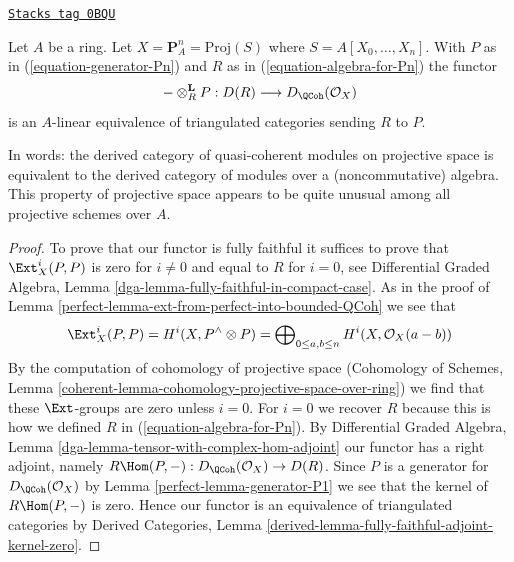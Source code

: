 \begin{lemma}
\label{perfect-lemma-Pn-module-category}
\href{https://stacks.math.columbia.edu/tag/0BQU}{\texttt{Stacks tag 0BQU}}

\begin{reference}
\cite{Beilinson}
\end{reference}
Let $A$ be a ring. Let $X = \mathbf{P}^n_A = \text{Proj}(S)$
where $S = A[X_0, \ldots, X_n]$. With
$P$ as in (\ref{equation-generator-Pn}) and
$R$ as in (\ref{equation-algebra-for-Pn})
the functor
$$
- \otimes_R^\mathbf{L} P : D(R) \longrightarrow D_\QCoh(\mathcal{O}_X)
$$
is an $A$-linear equivalence of triangulated categories sending $R$
to $P$.
\end{lemma}

In words: the derived category of quasi-coherent modules on
projective space is equivalent to the derived category of modules
over a (noncommutative) algebra.
This property of projective space appears to be quite unusual among
all projective schemes over $A$.

\begin{proof}

To prove that our functor is fully faithful it suffices to prove
that $\Ext^i_X(P, P)$ is zero for $i \not = 0$ and equal
to $R$ for $i = 0$, see
Differential Graded Algebra, Lemma
\ref{dga-lemma-fully-faithful-in-compact-case}.
As in the proof of
Lemma \ref{perfect-lemma-ext-from-perfect-into-bounded-QCoh}
we see that
$$
\Ext^i_X(P, P) = H^i(X, P^\wedge \otimes P) =
\bigoplus\nolimits_{0 \leq a, b \leq n} H^i(X, \mathcal{O}_X(a - b))
$$
By the computation of cohomology of projective space
(Cohomology of Schemes, Lemma
\ref{coherent-lemma-cohomology-projective-space-over-ring})
we find that
these $\Ext$-groups are zero unless $i = 0$.
For $i = 0$ we recover $R$ because this is how we defined $R$
in (\ref{equation-algebra-for-Pn}).
By Differential Graded Algebra, Lemma
\ref{dga-lemma-tensor-with-complex-hom-adjoint}
our functor has a right adjoint, namely
$R\Hom(P, -) : D_\QCoh(\mathcal{O}_X) \to D(R)$.
Since $P$ is a generator for $D_\QCoh(\mathcal{O}_X)$ by
Lemma \ref{perfect-lemma-generator-P1}
we see that the kernel of $R\Hom(P, -)$ is zero.
Hence our functor is an equivalence of triangulated
categories by Derived Categories, Lemma
\ref{derived-lemma-fully-faithful-adjoint-kernel-zero}.
\end{proof}

